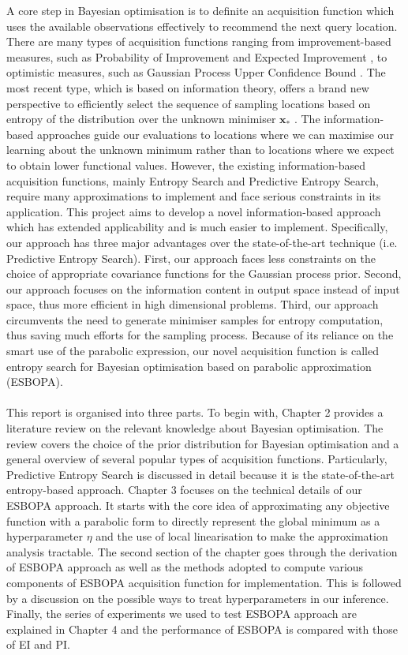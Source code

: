 \documentclass[a4paper,11pt]{report}
\begin{document}
A core step in Bayesian optimisation is to definite an acquisition function which uses the available observations effectively to recommend the next query location. There are many types of acquisition functions ranging from improvement-based measures, such as Probability of Improvement \cite{kushner1964new} and Expected Improvement \cite{jones1998efficient}, to optimistic measures, such as Gaussian Process Upper Confidence Bound \cite{srinivas2009gaussian}. The most recent type, which is based on information theory, offers a brand new perspective to efficiently select the sequence of sampling locations based on entropy of the distribution over the unknown minimiser $\mathbf{x}_*$ \cite{shahriari2016taking}. The information-based approaches guide our evaluations to locations where we can maximise our learning about the unknown minimum rather than to locations where we expect to obtain lower functional values\cite{hennig2012entropy}. However, the existing information-based acquisition functions, mainly Entropy Search and Predictive Entropy Search, require many approximations to implement and face serious constraints in its application. This project aims to develop a novel information-based approach which has extended applicability and is much easier to implement. Specifically, our approach has three major advantages over the state-of-the-art technique (i.e. Predictive Entropy Search). First, our approach faces less constraints on the choice of appropriate covariance functions for the Gaussian process prior. Second, our approach focuses on the information content in output space instead of input space, thus more efficient in high dimensional problems. Third, our approach circumvents the need to generate minimiser samples for entropy computation, thus saving much efforts for the sampling process. Because of its reliance on the smart use of the parabolic expression, our novel acquisition function is called entropy search for Bayesian optimisation based on parabolic approximation (ESBOPA). 
\\\\
This report is organised into  three parts. To begin with, Chapter 2 provides a literature review on the relevant knowledge about Bayesian optimisation. The review covers the choice of the prior distribution for Bayesian optimisation and a general overview of several popular types of acquisition functions. Particularly, Predictive Entropy Search is discussed in detail because it is the state-of-the-art entropy-based approach. Chapter 3 focuses on the technical details of our ESBOPA approach. It starts with the core idea of approximating any objective function with a parabolic form to directly represent the global minimum as a hyperparameter $\eta$ and the use of local linearisation to make the approximation analysis tractable. The second section of the chapter goes through the derivation of ESBOPA approach as well as the methods adopted to compute various components of  ESBOPA acquisition function for implementation. This is followed by a discussion on the possible ways to treat hyperparameters in our inference. Finally, the series of experiments we used to test ESBOPA approach are explained in Chapter 4 and the performance of ESBOPA is compared with those of EI and PI.  
\end{document}
